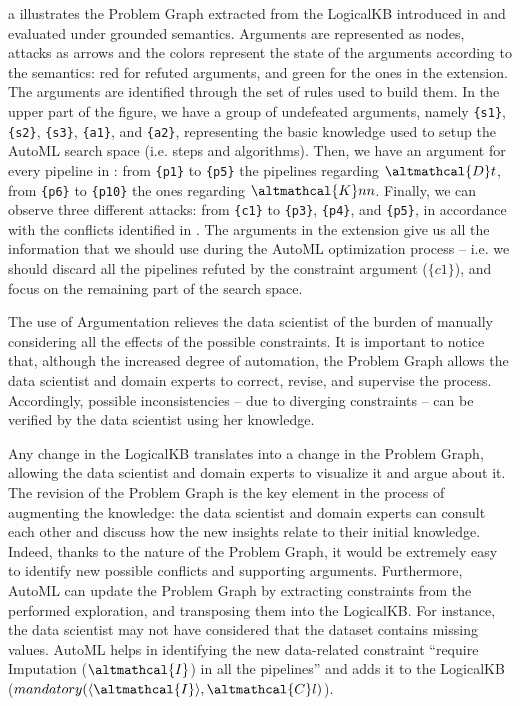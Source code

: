 \begin{example}
a illustrates the Problem Graph extracted from the LogicalKB introduced in  and evaluated under grounded semantics.
Arguments are represented as nodes, attacks as arrows and the colors represent the state of the arguments according to the semantics: red for refuted arguments, and green for the ones in the extension.
The arguments are identified through the set of rules used to build them.
In the upper part of the figure, we have a group of undefeated arguments, namely \texttt{\{s1\}}, \texttt{\{s2\}}, \texttt{\{s3\}}, \texttt{\{a1\}}, and \texttt{\{a2\}}, representing the basic knowledge used to setup the AutoML search space (i.e. steps and algorithms).
Then, we have an argument for every pipeline in : from \texttt{\{p1\}} to \texttt{\{p5\}} the pipelines regarding $\altmathcal{D}t$, from \texttt{\{p6\}} to \texttt{\{p10\}} the ones regarding $\altmathcal{K}nn$.
Finally, we can observe three different attacks: from \texttt{\{c1\}} to \texttt{\{p3\}}, \texttt{\{p4\}}, and \texttt{\{p5\}}, in accordance with the conflicts identified in .
The arguments in the extension give us all the information that we should use during the AutoML optimization process -- i.e. we should discard all the pipelines refuted by the constraint argument ($\{c1\}$), and focus on the remaining part of the search space.
\label{ex:graph}
\end{example}

The use of Argumentation relieves the data scientist of the burden of manually considering all the effects of the possible constraints.
It is important to notice that, although the increased degree of automation, the Problem Graph allows the data scientist and domain experts to correct, revise, and supervise the process.
Accordingly, possible inconsistencies -- due to diverging constraints -- can be verified by the data scientist using her knowledge.

Any change in the LogicalKB translates into a change in the Problem Graph, allowing the data scientist and domain experts to visualize it and argue about it.
The revision of the Problem Graph is the key element in the process of augmenting the knowledge: the data scientist and domain experts can consult each other and discuss how the new insights relate to their initial knowledge.
Indeed, thanks to the nature of the Problem Graph, it would be extremely easy to identify new possible conflicts and supporting arguments.
Furthermore, AutoML can update the Problem Graph by extracting constraints from the performed exploration, and transposing them into the LogicalKB.
For instance, the data scientist may not have considered that the dataset contains missing values.
AutoML helps in identifying the new data-related constraint ``require Imputation ($\altmathcal{I}$) in all the pipelines'' and adds it to the LogicalKB ($mandatory(\langle \altmathcal{I} \rangle, \altmathcal{C}l)$).

